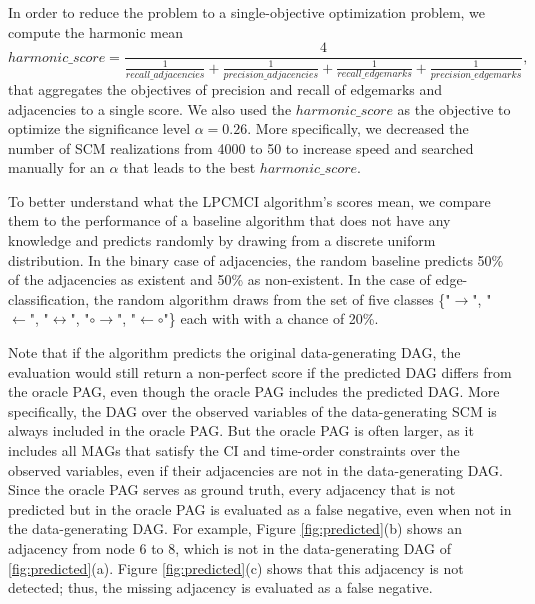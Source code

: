 \documentclass[conference]{IEEEtran}
\begin{document}
In order to reduce the problem to a single-objective optimization problem, we compute the harmonic mean
\begin{equation}
harmonic\_score=\frac{4}{\frac{1}{recall\_adjacencies}+\frac{1}{precision\_adjacencies}+\frac{1}{recall\_edgemarks}+\frac{1}{precision\_edgemarks}},
\label{eq:harmonicscore}
\end{equation}
that aggregates the objectives of precision and recall of edgemarks and adjacencies to a single score.
We also used the $harmonic\_score$ as the objective to optimize the significance level $\alpha=0.26$. More specifically, we decreased the number of SCM realizations from 4000 to 50 to increase speed and searched manually for an $\alpha$ that leads to the best $harmonic\_score$.

To better understand what the LPCMCI algorithm's scores mean, we compare them to the performance of a baseline algorithm that does not have any knowledge and predicts randomly by drawing from a discrete uniform distribution.
In the binary case of adjacencies, the random baseline predicts 50\% of the adjacencies as existent and 50\% as non-existent.
In the case of edge-classification, the random algorithm draws from the set of five classes \{"$\rightarrow$", "$\leftarrow$", "$\leftrightarrow$", "$\circ$$\rightarrow$", "$\leftarrow$$\circ$"\} each with with a chance of 20\%.

Note that if the algorithm predicts the original data-generating DAG, the evaluation would still return a non-perfect score if the predicted DAG differs from the oracle PAG, even though the oracle PAG includes the predicted DAG. More specifically, the DAG over the observed variables of the data-generating SCM is always included in the oracle PAG. But the oracle PAG is often larger, as it includes all MAGs that satisfy the CI and time-order constraints over the observed variables, even if their adjacencies are not in the data-generating DAG. Since the oracle PAG serves as ground truth, every adjacency that is not predicted but in the oracle PAG is evaluated as a false negative, even when not in the data-generating DAG.
For example, Figure \ref{fig:predicted}(b) shows an adjacency from node 6 to 8, which is not in the data-generating DAG of \ref{fig:predicted}(a). Figure \ref{fig:predicted}(c) shows that this adjacency is not detected; thus, the missing adjacency is evaluated as a false negative.
\end{document}
